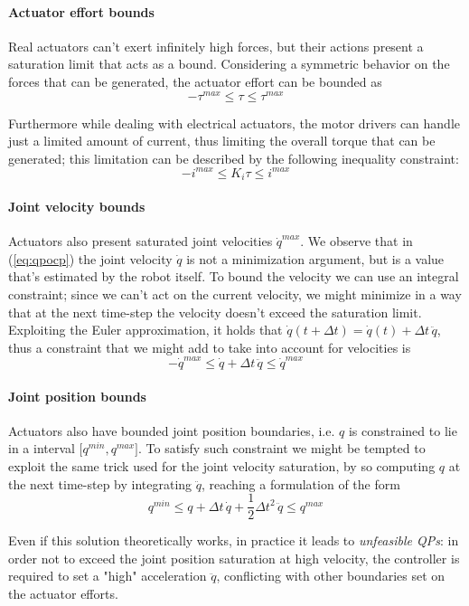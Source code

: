 	\paragraph{Actuator effort bounds} Real actuators can't exert infinitely high forces, but their actions present a saturation limit that acts as a bound. Considering a symmetric behavior on the forces that can be generated, the actuator effort can be bounded as
	\[ -\tau^{max} \leq \tau \leq \tau^{max} \]
	
	Furthermore while dealing with electrical actuators, the motor drivers can handle just a limited amount of current, thus limiting the overall torque that can be generated; this limitation can be described by the following inequality constraint:
	\[ -i^{max} \leq K_i \tau \leq i^{max} \]
	
	\paragraph{Joint velocity bounds} Actuators also present saturated joint velocities $\dot q^{max}$. We observe that in (\ref{eq:qpocp}) the joint velocity $\dot q$ is not a minimization argument, but is a value that's estimated by the robot itself. To bound the velocity we can use an integral constraint; since we can't act on the current velocity, we might minimize in a way that at the next time-step the velocity doesn't exceed the saturation limit. Exploiting the Euler approximation, it holds that $\dot q(t + \Delta t) = \dot q(t) + \Delta t \, \ddot q$, thus a constraint that we might add to take into account for velocities is
	\[ -\dot q^{max} \leq \dot q + \Delta t \, \ddot q \leq \dot q^{max} \]
	
	\paragraph{Joint position bounds} Actuators also have bounded joint position boundaries, i.e. $q $ is constrained to lie in a interval $\big[q^{min}, q^{max}\big]$. To satisfy such constraint we might be tempted to exploit the same trick used for the joint velocity saturation, by so computing $q$ at the next time-step by integrating $\ddot q$, reaching a formulation of the form
	\[ q^{min} \leq q + \Delta t\, \dot q + \frac 1 2 \Delta t^2 \, \ddot q \leq q^{max} \tag{$\circ$}\]
	
	Even if this solution theoretically works, in practice it leads to \textit{unfeasible QPs}: in order not to exceed the joint position saturation at high velocity, the controller is required to set a "high" acceleration $\ddot q$, conflicting with other boundaries set on the actuator efforts.
	
